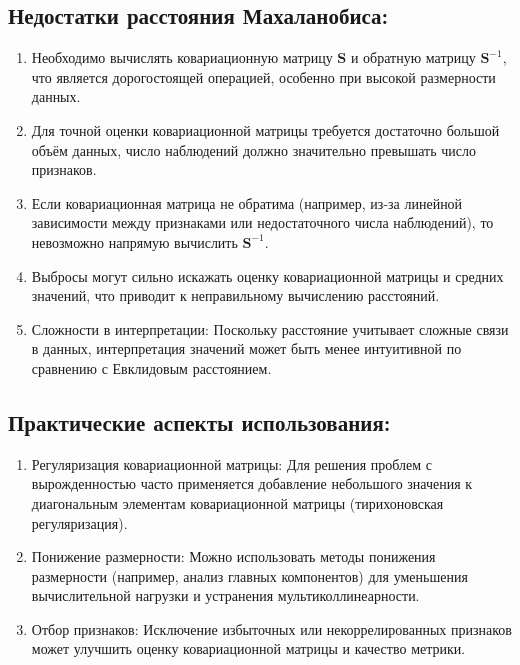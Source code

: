 \subsection{Недостатки расстояния Махаланобиса:}

\begin{enumerate}
    \item Необходимо вычислять ковариационную матрицу \( \mathbf{S} \)  и обратную матрицу \( \mathbf{S}^{-1} \), что является дорогостоящей операцией, особенно при высокой размерности данных.

    \item Для точной оценки ковариационной матрицы требуется достаточно большой объём данных, число наблюдений должно значительно превышать число признаков.

    \item Если ковариационная матрица не обратима (например, из-за линейной зависимости между признаками или недостаточного числа наблюдений), то невозможно напрямую вычислить \( \mathbf{S}^{-1} \).

    \item Выбросы могут сильно искажать оценку ковариационной матрицы и средних значений, что приводит к неправильному вычислению расстояний.

    \item Сложности в интерпретации: Поскольку расстояние учитывает сложные связи в данных, интерпретация значений может быть менее интуитивной по сравнению с Евклидовым расстоянием.
\end{enumerate}

\subsection{Практические аспекты использования:}

\begin{enumerate}
    \item Регуляризация ковариационной матрицы: Для решения проблем с вырожденностью часто применяется добавление небольшого значения к диагональным элементам ковариационной матрицы (тирихоновская регуляризация).

    \item Понижение размерности: Можно использовать методы понижения размерности (например, анализ главных компонентов) для уменьшения вычислительной нагрузки и устранения мультиколлинеарности.

    \item Отбор признаков: Исключение избыточных или некоррелированных признаков может улучшить оценку ковариационной матрицы и качество метрики.
\end{enumerate}

